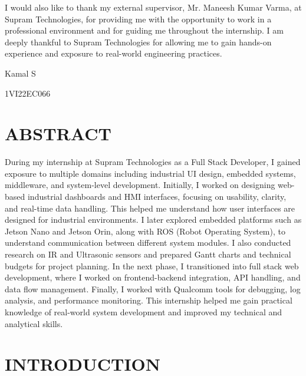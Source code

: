 \documentclass[12pt,a4paper]{report}
\begin{document}
I would also like to thank my external supervisor, Mr. Maneesh Kumar Varma, at Supram Technologies, for providing me with the opportunity to work in a professional environment and for guiding me throughout the internship. I am deeply thankful to Supram Technologies for allowing me to gain hands-on experience and exposure to real-world engineering practices.


\vspace{0.5cm}
Kamal S\par
1VI22EC066\par

\newpage
\chapter*{ABSTRACT}


During my internship at Supram Technologies as a Full Stack Developer, I gained exposure to multiple domains including industrial UI design, embedded systems, middleware, and system-level development. Initially, I worked on designing web-based industrial dashboards and HMI interfaces, focusing on usability, clarity, and real-time data handling. This helped me understand how user interfaces are designed for industrial environments. I later explored embedded platforms such as Jetson Nano and Jetson Orin, along with ROS (Robot Operating System), to understand communication between different system modules. I also conducted research on IR and Ultrasonic sensors and prepared Gantt charts and technical budgets for project planning. In the next phase, I transitioned into full stack web development, where I worked on frontend-backend integration, API handling, and data flow management. Finally, I worked with Qualcomm tools for debugging, log analysis, and performance monitoring. This internship helped me gain practical knowledge of real-world system development and improved my technical and analytical skills.


\newpage
\tableofcontents
{}

\newpage
\listoffigures
{}

\chapter{INTRODUCTION}
\end{document}
